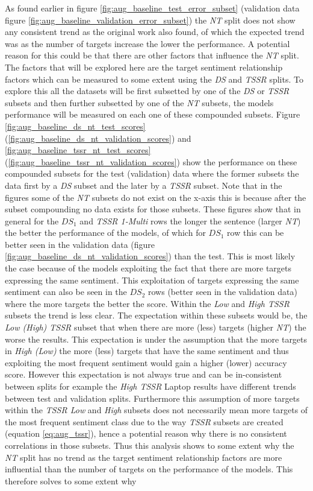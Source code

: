 As found earlier in figure \ref{fig:aug_baseline_test_error_subset} (validation data figure \ref{fig:aug_baseline_validation_error_subset}) the \textit{NT} split does not show any consistent trend as the original work \citep{aug_zhang2019aspectbased} also found, of which the expected trend was as the number of targets increase the lower the performance. A potential reason for this could be that there are other factors that influence the \textit{NT} split. The factors that will be explored here are the target sentiment relationship factors which can be measured to some extent using the \textit{DS} and \textit{TSSR} splits. To explore this all the datasets will be first subsetted by one of the \textit{DS} or \textit{TSSR} subsets and then further subsetted by one of the \textit{NT} subsets, the models performance will be measured on each one of these compounded subsets. Figure \ref{fig:aug_baseline_ds_nt_test_scores} (\ref{fig:aug_baseline_ds_nt_validation_scores}) and \ref{fig:aug_baseline_tssr_nt_test_scores} (\ref{fig:aug_baseline_tssr_nt_validation_scores}) show the performance on these compounded subsets for the test (validation) data where the former subsets the data first by a \textit{DS} subset and the later by a \textit{TSSR} subset. Note that in the figures some of the \textit{NT} subsets do not exist on the x-axis this is because after the subset compounding no data exists for those subsets. These figures show that in general for the $DS_1$ and \textit{TSSR 1-Multi} rows the longer the sentence (larger \textit{NT}) the better the performance of the models, of which for $DS_1$ row this can be better seen in the validation data (figure \ref{fig:aug_baseline_ds_nt_validation_scores}) than the test. This is most likely the case because of the models exploiting the fact that there are more targets expressing the same sentiment. This exploitation of targets expressing the same sentiment can also be seen in the $DS_2$ rows (better seen in the validation data) where the more targets the better the score. Within the \textit{Low} and \textit{High TSSR} subsets the trend is less clear. The expectation within these subsets would be, the \textit{Low (High) TSSR} subset that when there are more (less) targets (higher \textit{NT}) the worse the results. This expectation is under the assumption that the more targets in \textit{High (Low)} the more (less) targets that have the same sentiment and thus exploiting the most frequent sentiment would gain a higher (lower) accuracy score. However this expectation is not always true and can be in-consistent between splits for example the \textit{High TSSR} Laptop results have different trends between test and validation splits. Furthermore this assumption of more targets within the \textit{TSSR Low} and \textit{High} subsets does not necessarily mean more targets of the most frequent sentiment class due to the way \textit{TSSR} subsets are created (equation \ref{eq:aug_tssr}), hence a potential reason why there is no consistent correlations in those subsets. Thus this analysis shows to some extent why the \textit{NT} split has no trend as the target sentiment relationship factors are more influential than the number of targets on the performance of the models. This therefore solves to some extent why 